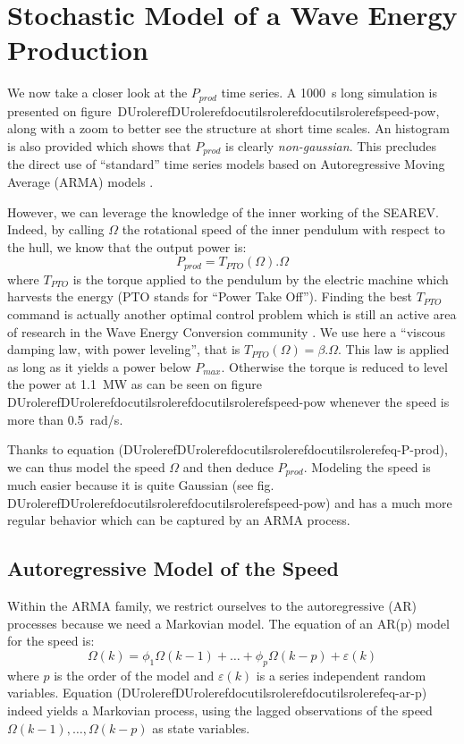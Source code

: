 \documentclass[letterpaper,compsoc,twoside]{IEEEtran}
\providecommand*{\DUrole}[2]{\ifcsname DUrole#1\endcsname \csname DUrole#1\endcsname{#2}\else \ifcsname docutilsrole#1\endcsname \csname docutilsrole#1\endcsname{#2}\else #2\fi \fi }
\begin{document}
\section{Stochastic Model of a Wave Energy Production\label{stochastic-model-of-a-wave-energy-production}\label{s-stoch-model}}


We now take a closer look at the $P_{prod}$ time series. A 1000~s
long simulation is presented on figure~\DUrole{ref}{speed-pow}, along
with a zoom to better see the structure at short time scales. An
histogram is also provided which shows that $P_{prod}$ is clearly
\emph{non-gaussian}. This precludes the direct use of “standard” time series
models based on Autoregressive Moving Average (ARMA) models \cite{Brockwell-1991}.

However, we can leverage the knowledge of the inner working of the SEAREV.
Indeed, by calling $\Omega$ the rotational speed of the inner
pendulum with respect to the hull, we know that the output power is:\begin{equation}
\label{eq-P-prod}
 P_{prod} = T_{PTO}(\Omega).\Omega
\end{equation}where $T_{PTO}$ is the torque applied to the pendulum by the
electric machine which harvests the energy (PTO stands for “Power Take
Off”). Finding the best $T_{PTO}$ command is actually another
optimal control problem which is still an active area of research in the
Wave Energy Conversion community \cite{Kovaltchouk-2013}. We use here a
“viscous damping law, with power leveling”, that is
$T_{PTO}(\Omega) = \beta.\Omega$. This law is applied as long as
it yields a power below $P_{max}$. Otherwise the torque is reduced
to level the power at 1.1~MW as can be seen on figure
\DUrole{ref}{speed-pow} whenever the speed is more than 0.5~rad/s.

Thanks to equation (\DUrole{ref}{eq-P-prod}), we can thus model the speed $\Omega$ and then
deduce $P_{prod}$. Modeling the speed is much easier because it is
quite Gaussian (see fig. \DUrole{ref}{speed-pow}) and has a much more
regular behavior which can be captured by an ARMA process.

\subsection{Autoregressive Model of the Speed\label{autoregressive-model-of-the-speed}}


Within the ARMA family, we restrict ourselves to the autoregressive
(AR) processes because we need a Markovian model. The equation of an AR(p)
model for the speed is:\begin{equation}
\label{eq-ar-p}
\Omega(k) = \phi_1 \Omega(k-1) + \dots +  \phi_p \Omega(k-p) +  \varepsilon(k)
\end{equation}where $p$ is the order of the model and $\varepsilon(k)$ is
a series independent random variables. Equation (\DUrole{ref}{eq-ar-p}) indeed yields a
Markovian process, using the lagged observations of the speed
$\Omega(k-1), \dots, \Omega(k-p)$ as state variables.
\end{document}

